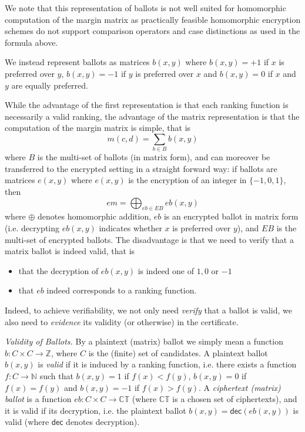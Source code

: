 \documentclass{llncs}
\newcommand{\Nat}{\mathbb{N}}
\newcommand{\Z}{\mathbb{Z}}
\newcommand{\encb}{\mathit{eb}}
\newcommand{\EncB}{\mathit{EB}}
\newcommand{\encm}{\mathit{em}}
\newcommand{\CT}{\mathbb{CT}}
\newcommand{\dec}{\mathsf{dec}}
\begin{document}
We note that this representation of ballots is not well suited for
homomorphic computation of the margin matrix as practically feasible
homomorphic encryption schemes do not support comparison operators
and case distinctions as used in the formula above. 

We instead represent ballots as matrices
$b(x, y)$ where $b(x, y) = +1$ if $x$ is preferred
over $y$, $b(x, y) = -1$ if $y$ is preferred over $x$ and $b(x, y) =
0$ if $x$ and $y$ are equally preferred.

While the advantage of the first representation is that each ranking
function is necessarily a valid ranking, the advantage of the matrix 
representation is that the computation of
the margin matrix is simple, that is
\[ m(c, d) = \sum_{b \in B} b(x, y) \]
where $B$ is the multi-set of ballots (in matrix form), and can
moreover be transferred to the encrypted setting in a straight
forward way: if ballots are matrices $e(x,y)$ where $e(x,y)$ is the
encryption of an integer in $\lbrace -1, 0, 1 \rbrace$, then
\begin{equation}\label{eqn:enc-mm}
\encm = \bigoplus_{\encb \in \EncB} \encb(x, y) 
\end{equation}
where $\oplus$ denotes homomorphic addition, $\encb$ is an encrypted
ballot in matrix form (i.e. decrypting $\encb(x, y)$ indicates
whether $x$ is preferred over $y$), and $\EncB$ is the multi-set of
encrypted ballots. The disadvantage is that we need to verify that a
matrix ballot is indeed valid, that is
\begin{itemize}
\item that the decryption of $\encb(x, y)$ is indeed one of $1, 0$ or
$-1$
\item that $\encb$ indeed corresponds to a ranking function.
\end{itemize}

\noindent
Indeed, to achieve verifiability, we not only need \emph{verify}
that a ballot is valid, we also need to \emph{evidence} its validity
(or otherwise) in the certificate.  

\smallskip\noindent\emph{Validity of Ballots.} By a plaintext
(matrix) ballot
we simply mean a function $b: C \times C \to \Z$,
where $C$ is the (finite) set of candidates. A 
plaintext ballot $b(x, y)$ 
is \emph{valid} if it is induced by a ranking function, i.e.
there exists a function $f: C \to \Nat$ such that $b(x, y) = 1$ if
$f(x) < f(y)$, $b(x, y) = 0$ if $f(x) = f(y)$ and $b(x, y) = -1$ if
$f(x) > f(y)$. A \emph{ciphertext (matrix) ballot} is a function
$\encb: C \times C \to \CT$ (where $\CT$ is a chosen set of
ciphertexts), and it is valid if its decryption,  i.e. the plaintext
ballot $b(x, y)  = \dec(\encb(x, y))$ is valid (where $\dec$ denotes
decryption).
\end{document}
